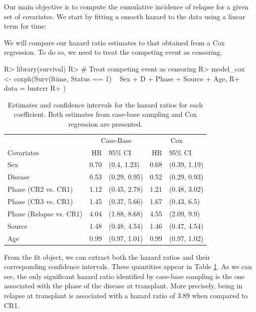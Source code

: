 \documentclass[
]{jss}
\begin{document}
Our main objective is to compute the cumulative incidence of relapse for
a given set of covariates. We start by fitting a smooth hazard to the
data using a linear term for time:

We will compare our hazard ratio estimates to that obtained from a Cox
regression. To do so, we need to treat the competing event as censoring.

\begin{CodeChunk}

\begin{CodeInput}
R> library(survival)
R> # Treat competing event as censoring
R> model_cox <- coxph(Surv(ftime, Status == 1) ~ Sex + D + Phase + Source + Age,
R+   data = bmtcrr
R+ )
\end{CodeInput}
\end{CodeChunk}

\begin{CodeChunk}
\begin{table}

\caption{\label{tab:bmtcrr-cis}Estimates and confidence intervals for the hazard ratios for each coefficient. Both estimates from case-base sampling and Cox regression are presented.}
\centering
\begin{tabular}[t]{lrlrl}
\toprule
\multicolumn{1}{c}{ } & \multicolumn{2}{c}{Case-Base} & \multicolumn{2}{c}{Cox} \\
\cmidrule(l{3pt}r{3pt}){2-3} \cmidrule(l{3pt}r{3pt}){4-5}
Covariates & HR & 95\% CI & HR & 95\% CI\\
\midrule
Sex & 0.70 & (0.4, 1.23) & 0.68 & (0.39, 1.19)\\
Disease & 0.53 & (0.29, 0.95) & 0.52 & (0.29, 0.93)\\
Phase (CR2 vs. CR1) & 1.12 & (0.45, 2.78) & 1.21 & (0.48, 3.02)\\
Phase (CR3 vs. CR1) & 1.45 & (0.37, 5.66) & 1.67 & (0.43, 6.5)\\
Phase (Relapse vs. CR1) & 4.04 & (1.88, 8.68) & 4.55 & (2.09, 9.9)\\
\addlinespace
Source & 1.48 & (0.48, 4.54) & 1.46 & (0.47, 4.54)\\
Age & 0.99 & (0.97, 1.01) & 0.99 & (0.97, 1.02)\\
\bottomrule
\end{tabular}
\end{table}

\end{CodeChunk}

From the fit object, we can extract both the hazard ratios and their
corresponding confidence intervals. These quantities appear in Table
\ref{tab:bmtcrr-cis}. As we can see, the only significant hazard ratio
identified by case-base sampling is the one associated with the phase of
the disease at transplant. More precisely, being in relapse at
transplant is associated with a hazard ratio of 3.89 when compared to
CR1.
\end{document}
